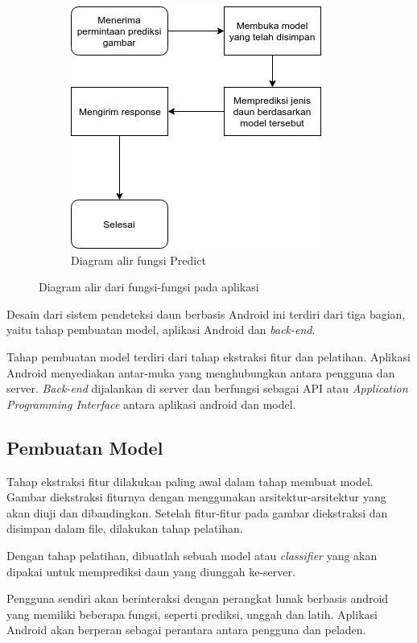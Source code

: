 \begin{figure}[H]
	\begin{subfigure}[b]{0.75\textwidth}
	\includegraphics[width=1\linewidth]{bab3/figures/predict.png}
	\caption{Diagram alir fungsi Predict}
	\label{fig:Ng2}
\end{subfigure}
	
	\caption{Diagram alir dari fungsi-fungsi pada aplikasi}
\end{figure}


\par Desain dari sistem pendeteksi daun berbasis Android ini terdiri dari tiga bagian, yaitu tahap pembuatan model, aplikasi Android dan \textit{back-end}. 
\par Tahap pembuatan model terdiri dari tahap ekstraksi fitur dan pelatihan. Aplikasi Android menyediakan antar-muka yang menghubungkan antara pengguna dan server. \textit{Back-end} dijalankan di server dan berfungsi sebagai API atau \textit{Application Programming Interface} antara aplikasi android dan model.
\subsection{Pembuatan Model}
\par Tahap ekstraksi fitur dilakukan paling awal dalam tahap membuat model. Gambar diekstraksi fiturnya dengan menggunakan arsitektur-arsitektur yang akan diuji dan dibandingkan. Setelah fitur-fitur pada gambar diekstraksi dan disimpan dalam file, dilakukan tahap pelatihan. 
\par Dengan tahap pelatihan, dibuatlah sebuah model atau \textit{classifier} yang akan dipakai untuk memprediksi daun yang diunggah ke-server.
\par Pengguna sendiri akan berinteraksi dengan perangkat lunak berbasis android yang memiliki beberapa fungsi, seperti prediksi, unggah dan latih. Aplikasi Android akan berperan sebagai perantara antara pengguna dan peladen.

